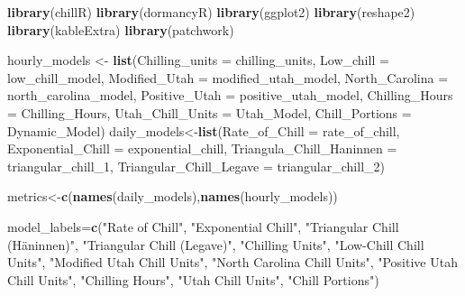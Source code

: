 \documentclass[
]{book}
\newenvironment{Shaded}{\begin{snugshade}}{\end{snugshade}}
\newcommand{\DataTypeTok}[1]{\textcolor[rgb]{0.13,0.29,0.53}{#1}}
\newcommand{\DecValTok}[1]{\textcolor[rgb]{0.00,0.00,0.81}{#1}}
\newcommand{\KeywordTok}[1]{\textcolor[rgb]{0.13,0.29,0.53}{\textbf{#1}}}
\newcommand{\NormalTok}[1]{#1}
\newcommand{\StringTok}[1]{\textcolor[rgb]{0.31,0.60,0.02}{#1}}
\begin{document}
\begin{Shaded}
\begin{Highlighting}[]
\KeywordTok{library}\NormalTok{(chillR)}
\KeywordTok{library}\NormalTok{(dormancyR)}
\KeywordTok{library}\NormalTok{(ggplot2)}
\KeywordTok{library}\NormalTok{(reshape2)}
\KeywordTok{library}\NormalTok{(kableExtra)}
\KeywordTok{library}\NormalTok{(patchwork)}


\NormalTok{hourly_models <-}\StringTok{ }\KeywordTok{list}\NormalTok{(}\DataTypeTok{Chilling_units =}\NormalTok{ chilling_units,}
     \DataTypeTok{Low_chill =}\NormalTok{ low_chill_model,}
     \DataTypeTok{Modified_Utah =}\NormalTok{ modified_utah_model,}
     \DataTypeTok{North_Carolina =}\NormalTok{ north_carolina_model,}
     \DataTypeTok{Positive_Utah =}\NormalTok{ positive_utah_model,}
     \DataTypeTok{Chilling_Hours =}\NormalTok{ Chilling_Hours,}
     \DataTypeTok{Utah_Chill_Units =}\NormalTok{ Utah_Model,}
     \DataTypeTok{Chill_Portions =}\NormalTok{ Dynamic_Model)}
\NormalTok{daily_models<-}\KeywordTok{list}\NormalTok{(}\DataTypeTok{Rate_of_Chill =}\NormalTok{ rate_of_chill, }
    \DataTypeTok{Exponential_Chill =}\NormalTok{ exponential_chill,}
    \DataTypeTok{Triangula_Chill_Haninnen =}\NormalTok{ triangular_chill_}\DecValTok{1}\NormalTok{,}
    \DataTypeTok{Triangular_Chill_Legave =}\NormalTok{ triangular_chill_}\DecValTok{2}\NormalTok{)}

\NormalTok{metrics<-}\KeywordTok{c}\NormalTok{(}\KeywordTok{names}\NormalTok{(daily_models),}\KeywordTok{names}\NormalTok{(hourly_models))}

\NormalTok{model_labels=}\KeywordTok{c}\NormalTok{(}\StringTok{"Rate of Chill"}\NormalTok{,}
               \StringTok{"Exponential Chill"}\NormalTok{,}
               \StringTok{"Triangular Chill (Häninnen)"}\NormalTok{,}
               \StringTok{"Triangular Chill (Legave)"}\NormalTok{,}
               \StringTok{"Chilling Units"}\NormalTok{,}
               \StringTok{"Low-Chill Chill Units"}\NormalTok{,}
               \StringTok{"Modified Utah Chill Units"}\NormalTok{,}
               \StringTok{"North Carolina Chill Units"}\NormalTok{,}
               \StringTok{"Positive Utah Chill Units"}\NormalTok{,}
               \StringTok{"Chilling Hours"}\NormalTok{,}
               \StringTok{"Utah Chill Units"}\NormalTok{,}
               \StringTok{"Chill Portions"}\NormalTok{)}




\end{Highlighting}
\end{Shaded}
\end{document}
